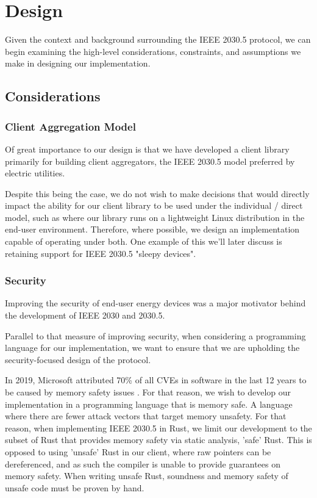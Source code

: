 \chapter{Design}\label{ch:design}
Given the context and background surrounding the IEEE 2030.5 protocol, we can begin examining the high-level considerations, constraints, and assumptions we make in designing our implementation.

\section{Considerations}

\subsection{Client Aggregation Model}
Of great importance to our design is that we have developed a client library primarily for building client aggregators, the IEEE 2030.5 model preferred by electric utilities.

Despite this being the case, we do not wish to make decisions that would directly impact the ability for our client library to be used under the individual / direct model, such as where our library runs on a lightweight Linux distribution in the end-user environment. Therefore, where possible, we design an implementation capable of operating under both. One example of this we'll later discuss is retaining support for IEEE 2030.5 "sleepy devices".

\subsection{Security}
Improving the security of end-user energy devices was a major motivator behind the development of IEEE 2030 and 2030.5. 

Parallel to that measure of improving security, when considering a programming language for our implementation, we want to ensure that we are upholding the security-focused design of the protocol.

In 2019, Microsoft attributed 70\% of all CVEs in software in the last 12 years to be caused by memory safety issues \cite[]{SecurityMemorySafety}. For that reason, we wish to develop our implementation in a programming language that is memory safe. A language where there are fewer attack vectors that target memory unsafety. For that reason, when implementing IEEE 2030.5 in Rust, we limit our development to the subset of Rust that provides memory safety via static analysis, 'safe' Rust. This is opposed to using 'unsafe' Rust in our client, where raw pointers can be dereferenced, and as such the compiler is unable to provide guarantees on memory safety. When writing unsafe Rust, soundness and memory safety of unsafe code must be proven by hand.

